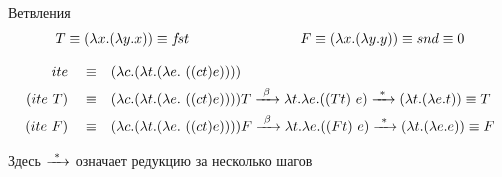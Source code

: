 \begin{frame}{Ветвления}
\def\ite{\lam{c}{\lam{t}{\lam{e}{\ \app{\app{c}{t}}{e}}}}}
\[
T\equiv(\lambda x . (\lambda y . x)) \equiv f\!st \qquad \qquad \qquad \qquad
F\equiv (\lambda x . (\lambda y . y))\equiv snd \equiv 0
\]

\begin{align*}
  ite \quad\equiv &\quad \lam{c}{\lam{t}{\lam{e}{\ \app{\app{c}{t}}{e}}}}\\
  (ite\ T) \quad\equiv &\quad \ite T \arrbeta \lambda t. \lambda e. (\app{T}{t}\ e) \arrmany \lam{t}{\lam{e}{t}}\equiv T\\
  (ite\ F) \quad\equiv &\quad \ite F \arrbeta \lambda t. \lambda e. (\app{F}{t}\ e) \arrmany \lam{t}{\lam{e}{e}}\equiv F
\end{align*}

Здесь $\xrightarrow{\ *\ }$ означает редукцию за несколько шагов
\end{frame}




